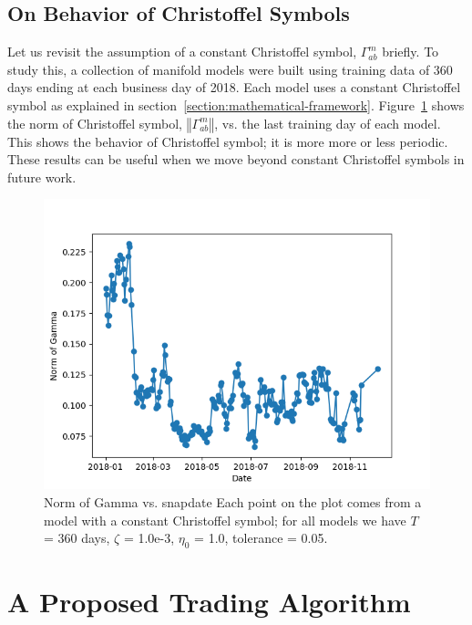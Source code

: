 \documentclass{article}
\begin{document}
\subsection{On Behavior of Christoffel Symbols}\label{subsection:christoffel-behavior}

Let us revisit the assumption of a constant Christoffel symbol,
$\Gamma^{m}_{ab}$ briefly. To study this, a collection of manifold
models were built using training data of 360 days ending at each
business day of 2018. Each model uses a constant Christoffel symbol as
explained in
section~\ref{section:mathematical-framework}. Figure~\ref{fig:gamma-time}
shows the norm of Christoffel symbol, $\left\Vert \Gamma^{m}_{ab}
\right\Vert$, vs. the last training day of each model. This shows the
behavior of Christoffel symbol; it is more more or less
periodic. These results can be useful when we move beyond constant
Christoffel symbols in future work.

\begin{figure}\label{fig:gamma-time}
\includegraphics[bb=0 0 640 480]{figures/Gamma_time_2018.png}
\caption{Norm of Gamma vs. snapdate Each point on the plot comes from
  a model with a constant Christoffel symbol; for all models we have
  $T$ = 360 days, $\zeta$ = 1.0e-3, $\eta_{0}$ = 1.0, tolerance =
  0.05.}
\end{figure}

\section{A Proposed Trading Algorithm}\label{section:trading-algorithm}
\end{document}
